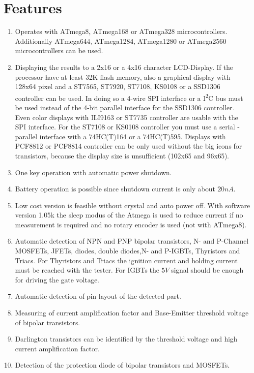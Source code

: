 \chapter{Features}
\label{sec:features}
\begin{enumerate}
\item Operates with ATmega8, ATmega168 or ATmega328 microcontrollers. Additionally ATmega644, ATmega1284,
ATmega1280 or ATmega2560 microcontrollers can be used.
\item Displaying the results to a 2x16 or a 4x16 character LCD-Display.
 If the processor have at least 32K flash memory, also a graphical display with 128x64 pixel and
a ST7565, ST7920, ST7108, KS0108 or a SSD1306 controller can be used.
In doing so a 4-wire SPI interface or a I\textsuperscript{2}C bus must be used instead of the 4-bit parallel interface for
the SSD1306 controller.
Even color displays with ILI9163 or ST7735 controller are usable with the SPI interface.
For the ST7108 or KS0108 controller you must use a serial - parallel interface with a 74HC(T)164 or a 74HC(T)595.
Displays with PCF8812 or PCF8814 controller can be only used without the big icons for transistors, because the display size is
unsufficient (102x65 and 96x65).
\item One key operation with automatic power shutdown.
\item Battery operation is possible since shutdown current is only about \(20nA\).
\item Low cost version is feasible without crystal and auto power off.
With software version 1.05k the sleep modus of the Atmega is used to reduce current if
no measurement is required and no rotary encoder is used (not with ATmega8).
\item Automatic detection of NPN and PNP bipolar transistors, N- and P-Channel MOSFETs, JFETs,
diodes, double diodes,N- and P-IGBTs, Thyristors and Triacs.
For Thyristors and Triacs the ignition current and holding current must be reached with the tester.
For IGBTs the \(5V\) signal should be enough for driving the gate voltage.
\item Automatic detection of pin layout of the detected part.
\item Measuring of current amplification factor and Base-Emitter threshold voltage of bipolar transistors.
\item Darlington transistors can be identified by the threshold voltage and high current amplification factor.
\item Detection of the protection diode of bipolar transistors and MOSFETs.

\end{enumerate}
